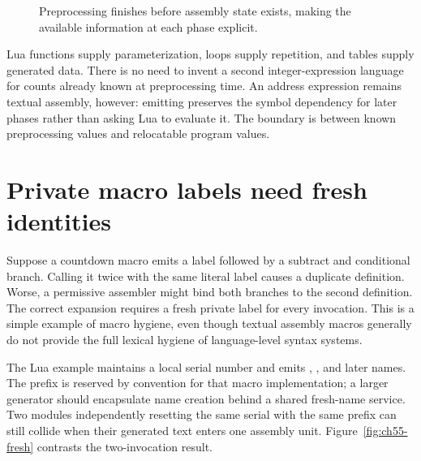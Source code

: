 \begin{figure}[htbp]
\centering
{}
\caption{Preprocessing finishes before assembly state exists, making the available information at each phase explicit.}
\label{fig:ch55-phases}
\end{figure}

Lua functions supply parameterization, loops supply repetition, and tables supply generated data.
There is no need to invent a second integer-expression language for counts already known at preprocessing time.
An address expression remains textual assembly, however: emitting  preserves the symbol dependency for later phases rather than asking Lua to evaluate it.
The boundary is between known preprocessing values and relocatable program values.

\section{Private macro labels need fresh identities}
\label{sec:ch55-labels}

Suppose a countdown macro emits a label followed by a subtract and conditional branch.
Calling it twice with the same literal label causes a duplicate definition.
Worse, a permissive assembler might bind both branches to the second definition.
The correct expansion requires a fresh private label for every invocation.
This is a simple example of macro hygiene, even though textual assembly macros generally do not provide the full lexical hygiene of language-level syntax systems.

The Lua example maintains a local serial number and emits , , and later names.
The prefix is reserved by convention for that macro implementation; a larger generator should encapsulate name creation behind a shared fresh-name service.
Two modules independently resetting the same serial with the same prefix can still collide when their generated text enters one assembly unit.
Figure~\ref{fig:ch55-fresh} contrasts the two-invocation result.

